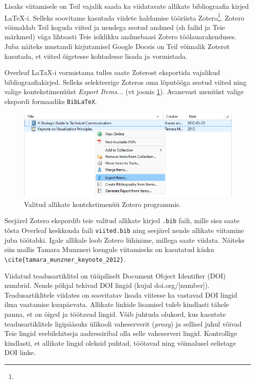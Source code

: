 Lisaks viitamisele on Teil vajalik saada ka viidatavate allikate bibliograafia kirjed LaTeX-i. Selleks soovitame kasutada viidete haldamise tööriista Zotero\footnote{}. Zotero võimaldab Teil koguda viited ja nendega seotud andmed (sh failid ja Teie märkmed) väga lihtsasti Teie isiklikku andmebaasi Zotero töölauarakenduses. Juba näiteks mustandi kirjutamisel Google Docsis on Teil võimalik Zoterot kasutada, et viited õigetesse kohtadesse lisada ja vormistada.

Overleaf LaTaX-i vormistama tulles saate Zoterost eksportida vajalikud bibliograafiakirjed. Selleks selekteerige Zoteros oma lõputööga seotud viited ning valige kontekstimenüüst \emph{Export Items...} (vt joonis \ref{fig:zoteroKontekst}). Avanevast menüüst valige ekspordi formaadiks \verb|BibLaTeX|. 

\begin{figure}[htb!]
    \centering
    \captionsetup{justification=centering}
    \includegraphics[width=\textwidth]{figures/Joonis3-ZoteroBibliograafiaEksport.png}
    \caption{Valitud allikate kontekstimenüü Zotero programmis.}
    \label{fig:zoteroKontekst}
\end{figure}

Seejärel Zotero ekspordib teie valitud allikate kirjed \verb|.bib| faili, mille sisu saate tõsta Overleaf keskkonda faili \verb|viited.bib| ning seejärel nende allikate viitamine juba töötabki. Igale allikale loob Zotero lühinime, millega saate viidata. Näiteks siin mallis Tamara Munzneri loengule viitamiseks on kasutatud käsku \verb|\cite{tamara_munzner_keynote_2012}|.

Viidatud teadusartiklitel on tüüpiliselt Document Object Identifier (DOI) numbrid. Nende põhjal tekivad DOI lingid  (kujul doi.org/[number]). Teadusartiklitele viidates on soovitatav lisada viitesse ka vastavad DOI lingid ilma vaatamise kuupäevata. Allikate linkide lisamisel tuleb kindlasti tähele panna, et on õiged ja töötavad lingid. Võib juhtuda olukord, kus kasutate teadusartiklitele ligipääsuks ülikooli vaheserverit (\emph{proxy}) ja sellisel juhul võivad Teie lingid veebilehitseja aadressiribal olla selle vaheserveri lingid. Kontrollige kindlasti, et allikate lingid oleksid puhtad, töötavad ning võimalusel eelistage DOI linke.

